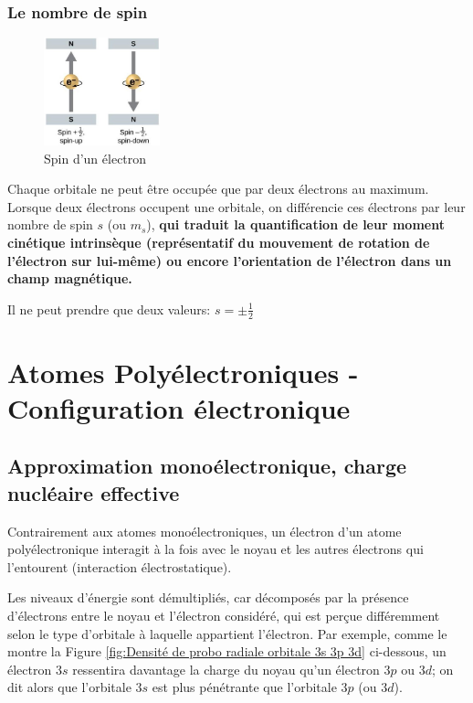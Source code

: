 \documentclass{article}
\begin{document}
\begin{center}
\quad {} \quad {}
\end{center}


\subsubsection{Le nombre de spin}\label{section: spin}

\begin{figure}
    \centering
    \vspace{-1.5cm}
    \includegraphics[width=0.3\textwidth]{Fig/spin.jpg} 
    \caption{Spin d'un électron}
    \label{fig:spin}
\end{figure}
Chaque orbitale ne peut être occupée que par deux électrons au maximum. Lorsque deux électrons occupent une orbitale, on différencie ces électrons par leur nombre de spin $s$ (ou $m_s$), \textbf{qui traduit la quantification de leur moment cinétique intrinsèque (représentatif du mouvement de rotation de l'électron sur lui-même) ou encore l'orientation de l'électron dans un champ magnétique.}

Il ne peut prendre que deux valeurs: $s=\pm \frac{1}{2}$



\section{Atomes Polyélectroniques - Configuration électronique}

\subsection{Approximation monoélectronique, charge nucléaire effective}

Contrairement aux atomes monoélectroniques, un électron d'un atome polyélectronique interagit à la fois avec le noyau et les autres électrons qui l'entourent (interaction électrostatique).

Les niveaux d'énergie sont démultipliés, car décomposés par la présence d'électrons entre le noyau et l'électron considéré, qui est perçue différemment selon le type d'orbitale à laquelle appartient l'électron. Par exemple, comme le montre la Figure \ref{fig:Densité de probo radiale orbitale 3s 3p 3d} ci-dessous, un électron $3s$ ressentira davantage la charge du noyau qu'un électron $3p$ ou $3d$; on dit alors que l'orbitale $3s$ est plus pénétrante que l'orbitale $3p$ (ou $3d$).
\end{document}
